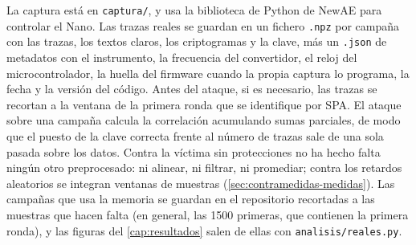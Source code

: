 La captura está en \texttt{captura/}, y usa la biblioteca de Python de NewAE
para controlar el Nano. Las trazas reales se guardan en un fichero \texttt{.npz}
por campaña con las trazas, los textos claros, los criptogramas y la clave, más
un \texttt{.json} de metadatos con el instrumento, la frecuencia del
convertidor, el reloj del microcontrolador, la huella del firmware cuando la
propia captura lo programa, la fecha y la versión del código. Antes del ataque,
si es necesario, las trazas se recortan a la ventana de la primera ronda que se
identifique por SPA. El ataque
sobre una campaña calcula la correlación acumulando sumas parciales, de modo
que el puesto de la clave correcta frente al número de trazas sale de una sola
pasada sobre los datos. Contra la víctima sin protecciones no ha hecho falta
ningún otro preprocesado: ni alinear, ni filtrar, ni promediar; contra los
retardos aleatorios se integran ventanas de muestras
(\cref{sec:contramedidas-medidas}). Las campañas que usa la
memoria se guardan en el repositorio recortadas a las muestras que hacen falta
(en general, las \num{1500} primeras, que contienen la primera ronda), y las
figuras del
\cref{cap:resultados} salen de ellas con \texttt{analisis/reales.py}.
